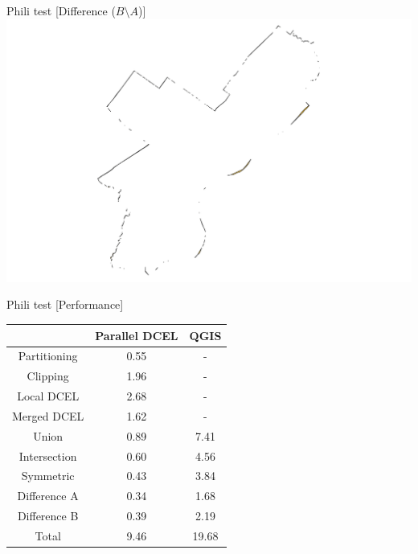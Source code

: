 \documentclass{beamer}
\begin{document}
\begin{frame}{Phili test [Difference ($B \setminus A$)]}
    \centering 
    \includegraphics[trim=6cm 0cm 6cm 0cm, clip, width=0.6\linewidth]{figures/differenceB} 
\end{frame}

\begin{frame}{Phili test [Performance]}
    \centering 
    \begin{tabular}{|c|c|c|}
        \hline
                        & Parallel DCEL & QGIS \\ \hline
        Partitioning    & 0.55  & - \\
        Clipping        & 1.96  & - \\
        Local DCEL      & 2.68  & - \\
        Merged DCEL     & 1.62  & - \\ \hline
        Union           & 0.89  & 7.41 \\
        Intersection    & 0.60  & 4.56 \\
        Symmetric       & 0.43  & 3.84 \\
        Difference A    & 0.34  & 1.68 \\
        Difference B    & 0.39  & 2.19 \\ \hline
        Total           & 9.46  & 19.68 \\ \hline
    \end{tabular}    
\end{frame}
\end{document}
